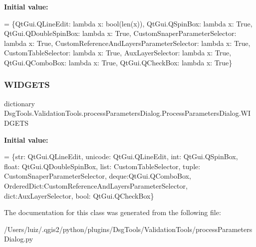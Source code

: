 {\bfseries Initial value\+:}
\begin{DoxyCode}
=  \{QtGui.QLineEdit: \textcolor{keyword}{lambda} x: bool(len(x)),
                  QtGui.QSpinBox: \textcolor{keyword}{lambda} x: \textcolor{keyword}{True},
                  QtGui.QDoubleSpinBox: \textcolor{keyword}{lambda} x: \textcolor{keyword}{True},
                  CustomSnaperParameterSelector: \textcolor{keyword}{lambda} x: \textcolor{keyword}{True},
                  CustomReferenceAndLayersParameterSelector: \textcolor{keyword}{lambda} x: \textcolor{keyword}{True},
                  CustomTableSelector: \textcolor{keyword}{lambda} x: \textcolor{keyword}{True},
                  AuxLayerSelector: \textcolor{keyword}{lambda} x: \textcolor{keyword}{True},
                  QtGui.QComboBox: \textcolor{keyword}{lambda} x: \textcolor{keyword}{True},
                  QtGui.QCheckBox: \textcolor{keyword}{lambda} x: \textcolor{keyword}{True}\}
\end{DoxyCode}
\mbox{\label{class_dsg_tools_1_1_validation_tools_1_1process_parameters_dialog_1_1_process_parameters_dialog_aa8e7fd4169fd8825dcb8c730a17dfcfa}} 
\subsubsection{\texorpdfstring{W\+I\+D\+G\+E\+TS}{WIDGETS}}
{\footnotesize\ttfamily dictionary Dsg\+Tools.\+Validation\+Tools.\+process\+Parameters\+Dialog.\+Process\+Parameters\+Dialog.\+W\+I\+D\+G\+E\+TS\hspace{0.3cm}{\ttfamily [static]}}

{\bfseries Initial value\+:}
\begin{DoxyCode}
=  \{str: QtGui.QLineEdit,
               unicode: QtGui.QLineEdit,
               int: QtGui.QSpinBox,
               float: QtGui.QDoubleSpinBox,
               list: CustomTableSelector,
               tuple: CustomSnaperParameterSelector,
               deque:QtGui.QComboBox,
               OrderedDict:CustomReferenceAndLayersParameterSelector,
               dict:AuxLayerSelector,
               bool: QtGui.QCheckBox\}
\end{DoxyCode}


The documentation for this class was generated from the following file\+:\begin{DoxyCompactItemize}
\item 
/\+Users/luiz/.\+qgis2/python/plugins/\+Dsg\+Tools/\+Validation\+Tools/process\+Parameters\+Dialog.\+py\end{DoxyCompactItemize}
